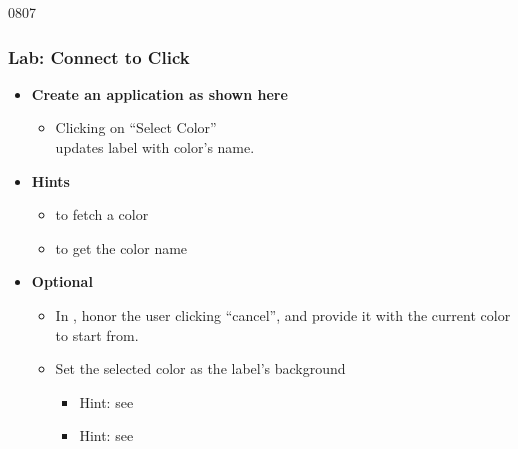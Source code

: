 \begin{slide}[fragile]{0807}
\frametitle{Lab: Connect to Click}
\label{project_signal_slot}
\begin{itemize}
\item \textbf{Create an application as shown here}
  \begin{itemize}
  \item Clicking on ``Select Color'' \\
    updates label with color's name.
  \end{itemize}
\item \textbf{Hints}
  \begin{itemize}
  \item {} to fetch a color
  \item {} to get the color name
 \end{itemize}
\item \textbf{Optional}
  \begin{itemize}
  \item In , honor the user clicking
    ``cancel'', and provide it with the current color to start from.
  \item Set the selected color as the label's background
    \begin{itemize}
    \item Hint: see 
    \item Hint: see 
    \end{itemize}

  \end{itemize}
\end{itemize}
\vfill
{}
\end{slide}

